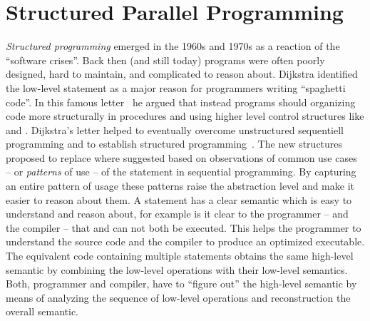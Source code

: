 \section{Structured Parallel Programming}
\emph{Structured programming} emerged in the 1960s and 1970s as a reaction of the ``software crises''.
Back then (and still today) programs were often poorly designed, hard to maintain, and complicated to reason about.
Dijkstra identified the low-level  statement as a major reason for programmers writing ``spaghetti code''.
In this famous letter~\cite{Dijkstra68a} he argued that instead programs should organizing code more structurally in procedures and using higher level control structures like  and .
Dijkstra's letter helped to eventually overcome unstructured sequentiell programming and to establish structured programming~\cite{DahlDiHo1972}.
The new structures proposed to replace  where suggested based on observations of common use cases -- or \emph{patterns} of use -- of the  statement in sequential programming.
By capturing an entire pattern of usage these patterns raise the abstraction level and make it easier to reason about them.
A  statement has a clear semantic which is easy to understand and reason about, for example is it clear to the programmer -- and the compiler -- that  and  can not both be executed.
This helps the programmer to understand the source code and the compiler to produce an optimized executable.
The equivalent code containing multiple  statements obtains the same high-level semantic by combining the low-level operations with their low-level semantics.
Both, programmer and compiler, have to ``figure out'' the high-level semantic by means of analyzing the sequence of low-level operations and reconstruction the overall semantic.

